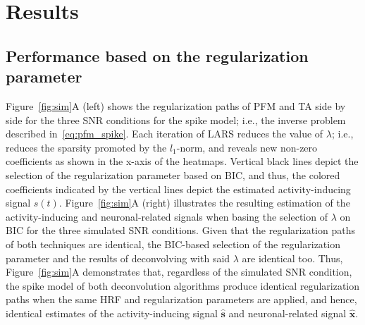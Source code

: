 
\section{Results}


\subsection{Performance based on the regularization parameter}
\label{sec:regpath}

Figure~\ref{fig:sim}A (left) shows the regularization paths of PFM and TA side by side for the three SNR conditions for the spike model; i.e., the inverse problem described in~\eqref{eq:pfm_spike}. Each iteration of LARS reduces the value of $\lambda$; i.e., reduces the sparsity promoted by the \(l_1\)-norm, and reveals new non-zero coefficients as shown in the x-axis of the heatmaps. Vertical black lines depict the selection of the regularization parameter based on BIC, and thus, the colored coefficients indicated by the vertical lines depict the estimated activity-inducing signal $s(t)$. Figure~\ref{fig:sim}A (right) illustrates the resulting estimation of the activity-inducing and neuronal-related signals when basing the selection of $\lambda$ on BIC for the three simulated SNR conditions. Given that the regularization paths of both techniques are identical, the BIC-based selection of the regularization parameter and the results of deconvolving with said $\lambda$ are identical too. Thus, Figure~\ref{fig:sim}A demonstrates that, regardless of the simulated SNR condition, the spike model of both deconvolution algorithms produce identical regularization paths when the same HRF and regularization parameters are applied, and hence, identical estimates of the activity-inducing signal $\mathbf{\hat{{s}}}$ and neuronal-related signal $\mathbf{\hat{{x}}}$.

